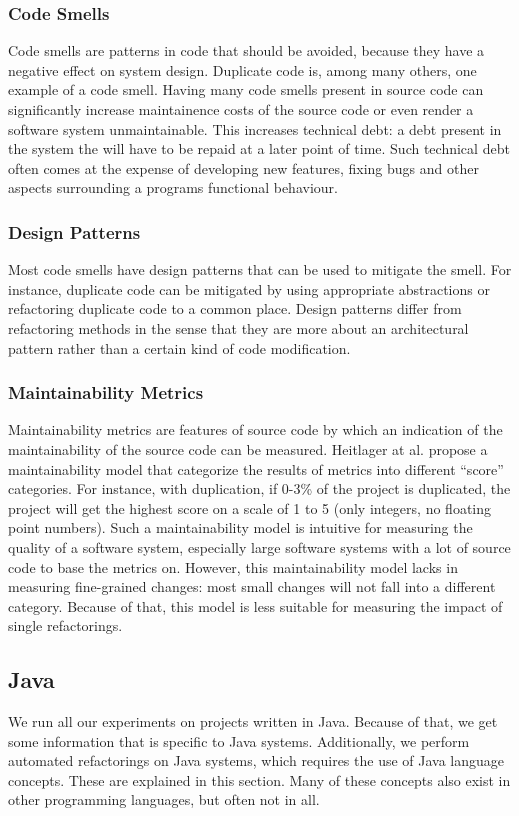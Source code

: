 \subsubsection{Code Smells}
Code smells are patterns in code that should be avoided, because they have a negative effect on system design. Duplicate code is, among many others, one example of a code smell. Having many code smells present in source code can significantly increase maintainence costs of the source code or even render a software system unmaintainable. This increases technical debt: a debt present in the system the will have to be repaid at a later point of time. Such technical debt often comes at the expense of developing new features, fixing bugs and other aspects surrounding a programs functional behaviour.

\subsubsection{Design Patterns}
Most code smells have design patterns that can be used to mitigate the smell. For instance, duplicate code can be mitigated by using appropriate abstractions or refactoring duplicate code to a common place. Design patterns differ from refactoring methods in the sense that they are more about an architectural pattern rather than a certain kind of code modification.

\subsubsection{Maintainability Metrics}
Maintainability metrics are features of source code by which an indication of the maintainability of the source code can be measured. Heitlager at al. \cite{heitlager2007practical} propose a maintainability model that categorize the results of metrics into different ``score'' categories. For instance, with duplication, if 0-3\% of the project is duplicated, the project will get the highest score on a scale of 1 to 5 (only integers, no floating point numbers). Such a maintainability model is intuitive for measuring the quality of a software system, especially large software systems with a lot of source code to base the metrics on. However, this maintainability model \cite{heitlager2007practical} lacks in measuring fine-grained changes: most small changes will not fall into a different category. Because of that, this model is less suitable for measuring the impact of single refactorings.

\subsection{Java}
We run all our experiments on projects written in Java. Because of that, we get some information that is specific to Java systems. Additionally, we perform automated refactorings on Java systems, which requires the use of Java language concepts. These are explained in this section. Many of these concepts also exist in other programming languages, but often not in all.

